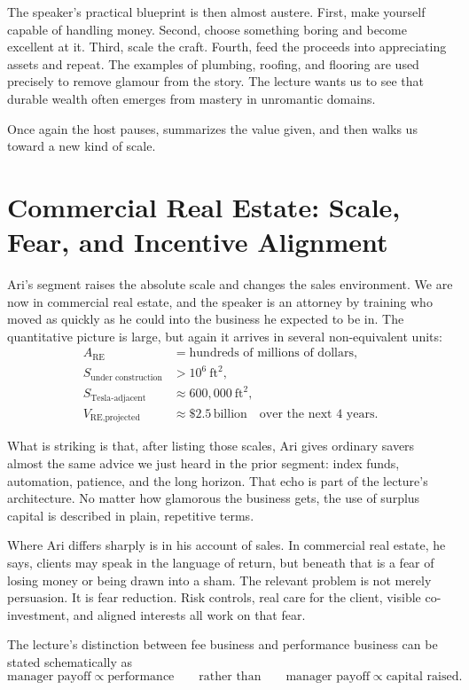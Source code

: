 The speaker's practical blueprint is then almost austere. First, make yourself capable of handling money. Second, choose something boring and become excellent at it. Third, scale the craft. Fourth, feed the proceeds into appreciating assets and repeat. The examples of plumbing, roofing, and flooring are used precisely to remove glamour from the story. The lecture wants us to see that durable wealth often emerges from mastery in unromantic domains.

Once again the host pauses, summarizes the value given, and then walks us toward a new kind of scale.

\section{Commercial Real Estate: Scale, Fear, and Incentive Alignment}

Ari's segment raises the absolute scale and changes the sales environment. We are now in commercial real estate, and the speaker is an attorney by training who moved as quickly as he could into the business he expected to be in. The quantitative picture is large, but again it arrives in several non-equivalent units:
\begin{align}
A_{\text{RE}} &= \text{hundreds of millions of dollars},\\
S_{\text{under construction}} &> 10^6\ \text{ft}^2,\\
S_{\text{Tesla-adjacent}} &\approx 600{,}000\ \text{ft}^2,\\
V_{\text{RE,projected}} &\approx \$2.5\,\text{billion}
\quad \text{over the next }4\text{ years.}
\end{align}

What is striking is that, after listing those scales, Ari gives ordinary savers almost the same advice we just heard in the prior segment: index funds, automation, patience, and the long horizon. That echo is part of the lecture's architecture. No matter how glamorous the business gets, the use of surplus capital is described in plain, repetitive terms.

Where Ari differs sharply is in his account of sales. In commercial real estate, he says, clients may speak in the language of return, but beneath that is a fear of losing money or being drawn into a sham. The relevant problem is not merely persuasion. It is fear reduction. Risk controls, real care for the client, visible co-investment, and aligned interests all work on that fear.

The lecture's distinction between fee business and performance business can be stated schematically as
\begin{equation}
\text{manager payoff} \propto \text{performance}
\qquad \text{rather than} \qquad
\text{manager payoff} \propto \text{capital raised}.
\end{equation}

